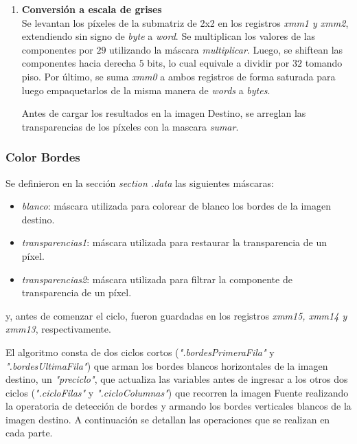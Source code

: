 \documentclass[a4paper]{article}
\begin{document}
\begin{itemize}
\begin{enumerate}
 	\item \textbf{Conversión a escala de grises}\\
 	
 	Se levantan los píxeles de la submatriz de 2x2 en los registros \textit{xmm1 y xmm2}, extendiendo sin signo de \textit{byte} a \textit{word}. Se multiplican los valores de las componentes por $29$ utilizando la máscara \textit{multiplicar}. Luego, se shiftean las componentes hacia derecha $5$ bits, lo cual equivale a dividir por $32$ tomando piso. Por último, se suma \textit{xmm0} a ambos registros de forma saturada para luego empaquetarlos de la  misma manera de \textit{words} a \textit{bytes}. 
 	
 	Antes de cargar los resultados en la imagen Destino, se arreglan las transparencias de los píxeles con la mascara \textit{sumar}. 
 	
 	
 	    
 \end{enumerate}
 
	
\end{itemize}	 


\subsubsection{Color Bordes}
Se definieron en la sección \textit{section .data} las siguientes máscaras:

\begin{itemize}
	\item \textit{blanco}: máscara utilizada para colorear de blanco los bordes de la imagen destino.
	\item \textit{transparencias1}: máscara utilizada para restaurar la transparencia de un píxel.
	\item \textit{transparencias2}: máscara utilizada para filtrar la componente de transparencia de un píxel.	
\end{itemize}	
\justify
y, antes de comenzar el ciclo, fueron guardadas en los registros \textit{xmm15, xmm14 y xmm13}, respectivamente.


\justify
El algoritmo consta de dos ciclos cortos (\textit{".bordesPrimeraFila"} y \textit{".bordesUltimaFila"}) que arman los bordes blancos horizontales de la imagen destino, un \textit{"preciclo"}, que actualiza las variables antes de ingresar a los otros dos ciclos (\textit{".cicloFilas"} y \textit{".cicloColumnas"}) que recorren la imagen Fuente realizando la operatoria de detección de bordes y armando los bordes verticales blancos de la imagen destino. A continuación se detallan las operaciones que se realizan en cada parte.
\end{document}
